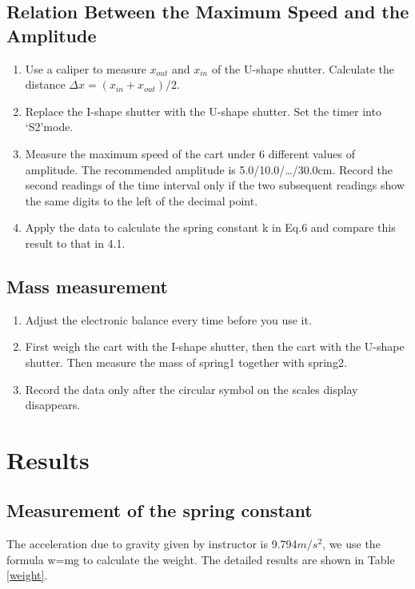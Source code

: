 \documentclass[12pt,a4paper]{article}
\begin{document}
\subsection{ Relation Between the Maximum Speed and the Amplitude}
\begin{enumerate}[1.]
    \item   Use a caliper to measure $x_{out}$ and $x_{in}$ of the U-shape shutter. Calculate the distance $\Delta x=(x_{in}+x_{out})/2$.
    \item Replace the I-shape shutter with the U-shape shutter. Set the timer into ‘S2’mode.
    \item  Measure the maximum speed of the cart under 6 different values of amplitude. The recommended amplitude is 5.0/10.0/…/30.0cm. Record the second readings of the time interval only if the two subsequent readings show the same digits to the left of the decimal point.
    \item  Apply the data to calculate the spring constant k in Eq.6 and compare this result to that in 4.1.
\end{enumerate}

\subsection{Mass measurement}
\begin{enumerate}[1.]
    \item Adjust the electronic balance every time before you use it.
    \item First weigh the cart with the I-shape shutter, then the cart with the U-shape shutter. Then measure the mass of spring1 together with spring2.
    \item Record the data only after the circular symbol on the scales display disappears.
\end{enumerate}

\section{Results}

\subsection{Measurement of the spring constant}
The acceleration due to gravity given by instructor is 9.794$m/s^2$, we use the formula w=mg to calculate the weight. The detailed results are shown in Table \ref{weight}.
\end{document}
